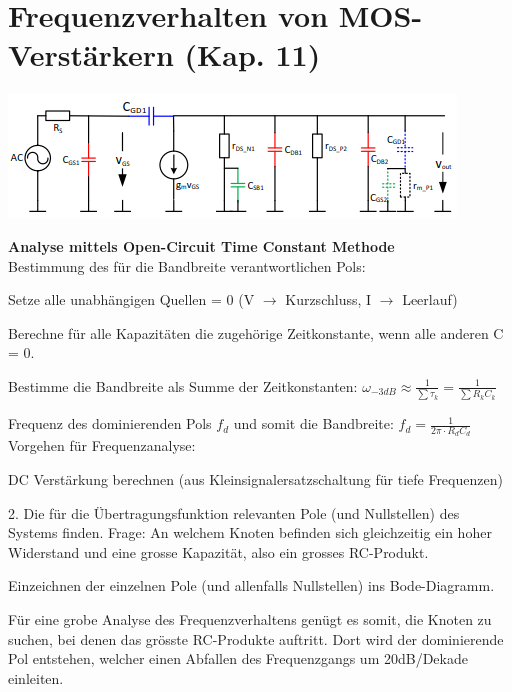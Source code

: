 
\section{Frequenzverhalten von MOS-Verstärkern (Kap. 11)}
\begin{minipage}[c]{0.5\textwidth}
	\includegraphics[width=1\linewidth]{chapters/Frequenzverhalten/images/parasitaere_kapazitaeten}
\end{minipage}
\begin{minipage}[c]{0.5\textwidth}
\textbf{Analyse mittels Open-Circuit Time Constant Methode} \\
Bestimmung des für die Bandbreite verantwortlichen Pols:
\begin{compactenum}
	\item Setze alle unabhängigen Quellen = 0 (V $\rightarrow$ Kurzschluss, I $\rightarrow$ Leerlauf)
	\item Berechne für alle Kapazitäten die zugehörige Zeitkonstante, wenn alle anderen C = 0.
\end{compactenum}
\end{minipage}
\begin{compactenum}
	\setcounter{enumi}{2}
	\item Bestimme die Bandbreite als Summe der Zeitkonstanten: $\omega_{-3dB}\approx \frac{1}{\sum\tau_k}=\frac{1}{\sum R_kC_k}$
\end{compactenum}
Frequenz des dominierenden Pols $f_d$ und somit die Bandbreite: $f_d=\frac{1}{2\pi \cdot R_dC_d}$\\
Vorgehen für Frequenzanalyse:
\begin{compactenum}
	\item DC Verstärkung berechnen (aus Kleinsignalersatzschaltung für tiefe Frequenzen)
	\item 2. Die für die Übertragungsfunktion relevanten Pole (und Nullstellen) des	Systems finden. Frage: An welchem Knoten befinden sich gleichzeitig ein hoher Widerstand und eine grosse Kapazität, also ein grosses RC-Produkt.
	\item Einzeichnen der einzelnen Pole (und allenfalls Nullstellen) ins Bode-Diagramm.
\end{compactenum}
Für eine grobe Analyse des Frequenzverhaltens genügt es somit, die Knoten zu suchen, bei denen das grösste RC-Produkte auftritt. Dort wird der dominierende Pol entstehen, welcher einen Abfallen des Frequenzgangs um 20dB/Dekade einleiten.

